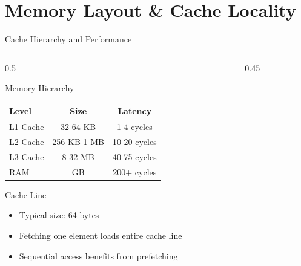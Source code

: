 \documentclass[aspectratio=169,xcolor=dvipsnames]{beamer}
\begin{document}
\section{Memory Layout \& Cache Locality}

\begin{frame}{Cache Hierarchy and Performance}
  \begin{columns}
    \begin{column}{0.5\textwidth}
      \begin{block}{Memory Hierarchy}
        \begin{tabular}{l|c|c}
          \textbf{Level} & \textbf{Size} & \textbf{Latency} \\
          \hline
          L1 Cache & 32-64 KB & 1-4 cycles \\
          L2 Cache & 256 KB-1 MB & 10-20 cycles \\
          L3 Cache & 8-32 MB & 40-75 cycles \\
          RAM & GB & 200+ cycles \\
        \end{tabular}
      \end{block}

      \vspace{0.3cm}

      \begin{block}{Cache Line}
        \begin{itemize}
          \item Typical size: 64 bytes
          \item Fetching one element loads entire cache line
          \item Sequential access benefits from prefetching
        \end{itemize}
      \end{block}
    \end{column}
    \begin{column}{0.45\textwidth}
\end{column}
\end{columns}
\end{frame}
\end{document}

